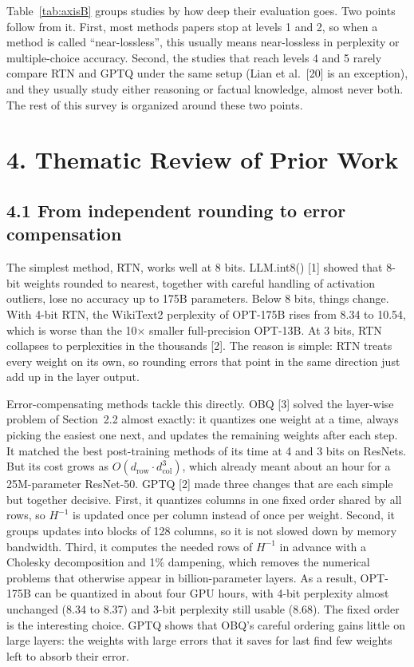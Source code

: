 \documentclass[10pt,twocolumn]{article}
\begin{document}
Table~\ref{tab:axisB} groups studies by how deep their evaluation goes.
Two points follow from it. First, most methods papers stop at levels 1
and 2, so when a method is called ``near-lossless'', this usually means
near-lossless in perplexity or multiple-choice accuracy. Second, the
studies that reach levels 4 and 5 rarely compare RTN and GPTQ under the
same setup (Lian et al.~[20] is an exception), and they usually study
either reasoning or factual knowledge, almost never both. The rest of
this survey is organized around these two points.

\section{4. Thematic Review of Prior Work}

\subsection{4.1 From independent rounding to error compensation}

The simplest method, RTN, works well at 8 bits. LLM.int8() [1] showed
that 8-bit weights rounded to nearest, together with careful handling of
activation outliers, lose no accuracy up to 175B parameters. Below 8
bits, things change. With 4-bit RTN, the WikiText2 perplexity of
OPT-175B rises from 8.34 to 10.54, which is worse than the 10$\times$
smaller full-precision OPT-13B. At 3 bits, RTN collapses to perplexities
in the thousands [2]. The reason is simple: RTN treats every weight on
its own, so rounding errors that point in the same direction just add up
in the layer output.

Error-compensating methods tackle this directly. OBQ [3] solved the
layer-wise problem of Section~2.2 almost exactly: it quantizes one
weight at a time, always picking the easiest one next, and updates the
remaining weights after each step. It matched the best post-training
methods of its time at 4 and 3 bits on ResNets. But its cost grows as
$O(d_{\mathrm{row}} \cdot d_{\mathrm{col}}^{3})$, which already meant
about an hour for a 25M-parameter ResNet-50. GPTQ [2] made three changes
that are each simple but together decisive. First, it quantizes columns
in one fixed order shared by all rows, so $H^{-1}$ is updated once per
column instead of once per weight. Second, it groups updates into blocks
of 128 columns, so it is not slowed down by memory bandwidth. Third, it
computes the needed rows of $H^{-1}$ in advance with a Cholesky
decomposition and 1\% dampening, which removes the numerical problems
that otherwise appear in billion-parameter layers. As a result, OPT-175B
can be quantized in about four GPU hours, with 4-bit perplexity almost
unchanged (8.34 to 8.37) and 3-bit perplexity still usable (8.68). The
fixed order is the interesting choice. GPTQ shows that OBQ's careful
ordering gains little on large layers: the weights with large errors
that it saves for last find few weights left to absorb their error.
\end{document}
